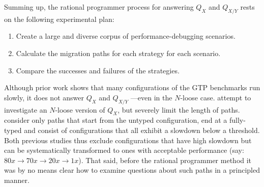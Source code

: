 Summing up, the rational programmer process for answering $Q_X$ and $Q_{X/Y}$ rests on the following
experimental plan:
\begin{enumerate}

\item Create a large and diverse corpus of performance-debugging scenarios.

\item Calculate the migration paths for each strategy for
  each scenario.

\item Compare the successes and failures of the strategies.

\end{enumerate}

Although prior work shows that many configurations of the GTP benchmarks
run slowly, it does not answer $Q_X$ and $Q_{X/Y}$ 
---even in the $N$-loose case.  \citet{gtnffvf-jfp-2019} attempt to
investigate an $N$-loose version of  $Q_X$, but severely limit the length of paths.
\citet{g-deep-shallow} consider only paths that start from the untyped
configuration, end at a fully-typed and consist of configurations that 
all exhibit a slowdown below a threshold.  Both previous studies thus exclude
configurations that have high slowdown but can be systematically
transformed to ones with acceptable performance (say: $80x \rightarrow 70x
\rightarrow 20x \rightarrow 1x$). That said, before the rational programmer 
method it was by no means clear how to examine questions about such paths in a
principled manner.
